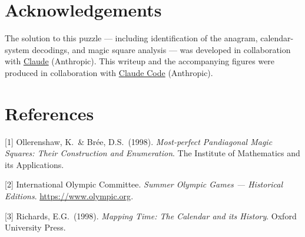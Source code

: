 \documentclass{article}
\begin{document}
\section*{Acknowledgements}

The solution to this puzzle --- including identification of the
anagram, calendar-system decodings, and magic square analysis ---
was developed in collaboration with
\href{https://claude.ai}{Claude} (Anthropic).  This writeup and
the accompanying figures were produced in collaboration with
\href{https://claude.ai/code}{Claude Code} (Anthropic).

\section*{References}

{\small

[1] Ollerenshaw, K.\ \& Br\'ee, D.S.\ (1998).
\textit{Most-perfect Pandiagonal Magic Squares: Their Construction
and Enumeration}.
The Institute of Mathematics and its Applications.

[2] International Olympic Committee.
\textit{Summer Olympic Games --- Historical Editions}.
\url{https://www.olympic.org}.

[3] Richards, E.G.\ (1998).
\textit{Mapping Time: The Calendar and its History}.
Oxford University Press.

}
\end{document}

